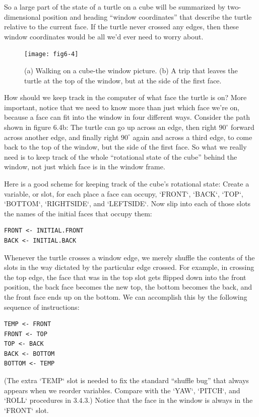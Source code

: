 \documentclass{book}
\begin{document}
So a large part of the state of a turtle on a cube will be summarized
by two-dimensional position and heading ``window coordinates'' that
describe the turtle relative to the current face. If the turtle never crossed
any edges, then these window coordinates would be all we'd ever need
to worry about.

\begin{figure}
\begin{center}
\texttt{[image: fig6-4]}
\caption{(a) Walking on a cube-the window picture. (b) A trip that leaves the turtle at the top of the window, but at the side of the first face.}
\end{center}
\end{figure}

How should we keep track in the computer of what face the turtle is
on? More important, notice that we need to know more than just which
face we're on, because a face can fit into the window in four different
ways. Consider the path shown in figure 6.4b: The turtle can go up
across an edge, then right $90^{\circ}$ forward across another edge, and finally
right $90^{\circ}$ again and across a third edge, to come back to the top of the
window, but the side of the first face. So what we really need is to keep
track of the whole ``rotational state of the cube'' behind the window,
not just which face is in the window frame.

Here is a good scheme for keeping track of the cube's rotational state:
Create a variable, or slot, for each place a face can occupy, \textsc{`FRONT`}, \textsc{`BACK`},
\textsc{`TOP`}, \textsc{`BOTTOM`}, \textsc{`RIGHTSIDE`}, and \textsc{`LEFTSIDE`}. Now slip into each of those
slots the names of the initial faces that occupy them:

\begin{verbatim}
FRONT <- INITIAL.FRONT
BACK <- INITIAL.BACK
\end{verbatim}
Whenever the turtle crosses a window edge, we merely shuffle the
contents of the slots in the way dictated by the particular edge crossed.
For example, in crossing the top edge, the face that was in the top
slot gets flipped down into the front position, the back face becomes
the new top, the bottom becomes the back, and the front face ends up
on the bottom. We can accomplish this by the following sequence of
instructions:

\begin{verbatim}
TEMP <- FRONT
FRONT <- TOP
TOP <- BACK
BACK <- BOTTOM
BOTTOM <- TEMP
\end{verbatim}
(The extra \textsc{`TEMP`} slot is needed to fix the standard ``shuffle bug'' that
always appears when we reorder variables. Compare with the \textsc{`YAW`},
\textsc{`PITCH`}, and \textsc{`ROLL`} procedures in 3.4.3.) Notice that the face in the window
is always in the \textsc{`FRONT`} slot.
\end{document}
